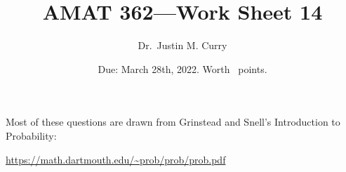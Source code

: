 \documentclass[addpoints,12pt]{exam}
\title{\vspace{-1in} AMAT 362---Work Sheet 14}
\date{Due: March 28th, 2022. Worth \numpoints\ points.}
\author{Dr.~Justin M. Curry}
\begin{document}
\maketitle




Most of these questions are drawn from Grinstead and Snell's Introduction to Probability:

\url{https://math.dartmouth.edu/~prob/prob/prob.pdf}
\end{document}
